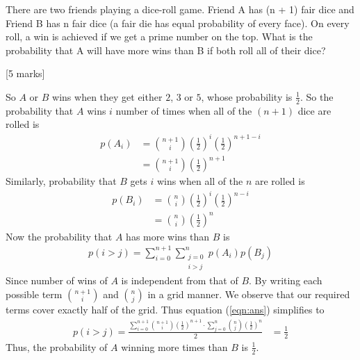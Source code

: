 \begin{que}
	There are two friends playing a dice-roll game. Friend A has (n + 1) fair dice and Friend B has n
	fair dice (a fair die has equal probability of every face). On every roll, a win is achieved if we get a
	prime number on the top. What is the probability that A will have more wins than B if both roll
	all of their dice?

	\hspace*{\fill} [5 marks]
\end{que}
\begin{tcolorbox}
	\begin{sol}
		So $A$ or $B$ wins when they get either $2$, $3$ or $5$, whose probability is $\frac{1}{2}$. So the probability that $A$ wins $i$ number of times when all of the $(n+1)$ dice are rolled is
		\begin{align}
			p(A_i) & = \binom{n+1}{i} \left(\frac{1}{2}\right)^{i} \left(\frac{1}{2}\right)^{n+1-i} \\
			       & = \binom{n+1}{i} \left(\frac{1}{2}\right)^{n+1}
		\end{align}
		Similarly, probability that $B$ gets $i$ wins when all of the $n$ are rolled is
		\begin{align}
			p(B_i) & = \binom{n}{i} \left(\frac{1}{2}\right)^{i} \left(\frac{1}{2}\right)^{n-i} \\
			       & = \binom{n}{i} \left(\frac{1}{2}\right)^{n}
		\end{align}
		Now the probability that $A$ has more wins than $B$ is
		\begin{align}
			p(i>j) = \sum_{i=0}^{n+1}\sum_{\substack{j=0 \\ i>j}}^{n} p(A_i)p(B_j)
			\label{eqn:ans}
		\end{align}
		Since number of wins of $A$ is independent from that of $B$.
		By writing each possible term $\binom{n+1}{i}$ and $\binom{n}{j}$ in a grid manner. We observe that our required terms cover exactly half of the grid. Thus equation (\ref{eqn:ans}) simplifies to
		\begin{align}
			p(i>j) = \frac{\sum_{i=0}^{n+1}\binom{n+1}{i}\left(\frac{1}{2}\right)^{n+1}\cdot\sum_{j=0}^{n}\binom{n}{j}\left(\frac{1}{2}\right)^{n}}{2}
			 & = \frac{1}{2}
		\end{align}
		Thus, the probability of $A$ winning more times than $B$ is $\frac{1}{2}$.
	\end{sol}
\end{tcolorbox}
